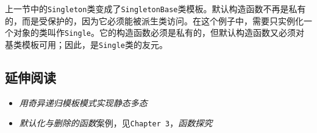 
上一节中的\texttt{Singleton}类变成了\texttt{SingletonBase}类模板。默认构造函数不再是私有的，而是受保护的，因为它必须能被派生类访问。在这个例子中，需要只实例化一个对象的类叫作\texttt{Single}。它的构造函数必须是私有的，但默认构造函数又必须对基类模板可用；因此，是\texttt{Single}类的友元。



\subsection{延伸阅读}



\begin{itemize}
\item \textit{用奇异递归模板模式实现静态多态}



\item \textit{默认化与删除的函数}案例，见\texttt{Chapter 3}，\textit{函数探究}

\end{itemize}
